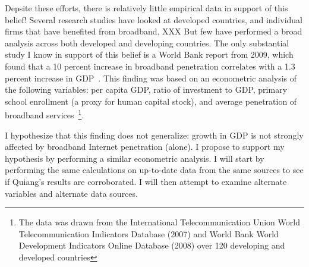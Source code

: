 Depsite these efforts, there is relatively little empirical data in support of this belief!
Several research studies have looked at developed countries, and individual
firms that have benefited from broadband. XXX
But few have performed a broad analysis across both developed and developing
countries. The only substantial study I know in support of this belief is a World Bank report
from 2009, which found that a 10 percent increase in broadband penetration
correlates with a 1.3 percent increase in GDP~\cite{qiang2009economic}. This
finding was based on an econometric analysis of the following
variables: per capita GDP, ratio of
investment to GDP, primary school enrollment (a proxy for human capital stock),
and average penetration of broadband services~\footnote{The data was drawn
from the International Telecommunication Union World
Telecommunication Indicators Database (2007) and World Bank World Development Indicators Online
Database (2008) over 120 developing
and developed countries}.

I hypothesize that this finding does not generalize: growth in GDP is not
strongly affected by broadband Internet penetration (alone). I propose to
support my hypothesis by performing a similar econometric analysis. I will
start by performing the same calculations on up-to-date data from the same
sources to see if
Quiang's results are corroborated. I will then attempt to examine alternate
variables and alternate data sources.


